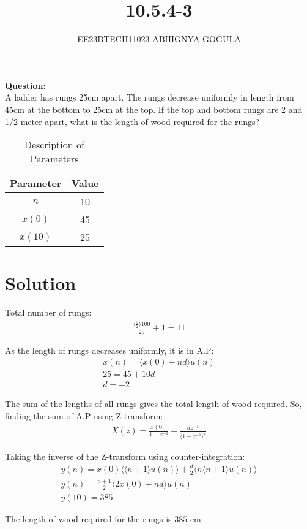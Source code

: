 \documentclass[journal,12pt,twocolumn]{IEEEtran}
\newcommand{\brak}[1]{\langle #1 \rangle}
\theoremstyle{remark}
\begin{document}

\vspace{3cm}
\title{\textbf{10.5.4-3}}
\author{EE23BTECH11023-ABHIGNYA GOGULA}
\maketitle
\newpage
\bigskip
\renewcommand{\thefigure}{\theenumi}
\renewcommand{\thetable}{\theenumi}
\textbf{Question:}
\\
 A ladder has rungs 25cm apart. The rungs decrease uniformly in length from 45cm at the bottom to 25cm at the top. If the top and bottom rungs are 2 and 1/2 meter apart, what is the length of wood required for the rungs?

\begin{table}[h]
\centering
\begin{tabular}{|c|c|}
\hline
Parameter & Value \\
\hline
$n$ & 10 \\
\hline
$x(0)$ & 45 \\
\hline
$x(10)$ & 25 \\
\hline
\end{tabular}
\caption{Description of Parameters}
\label{tab:parameter-values}
\end{table}

\section*{Solution}
Total number of rungs:
\begin{align}
\frac{\brak{\frac{5}{2}}100}{25}+1 = 11
\end{align}

As the length of rungs decreases uniformly, it is in A.P:
\begin{align}
x(n) = \brak{x(0) + nd}u(n) \\
25 = 45 + 10d \\
d = -2
\end{align}

The sum of the lengths of all rungs gives the total length of wood required. So, finding the sum of A.P using Z-transform:
\begin{align}
X(z) = \frac{x(0)}{1-z^{-1}} + \frac{dz^{-1}}{\brak{1-z^{-1}}^{2}}
\end{align}

Taking the inverse of the Z-transform using counter-integration:
\begin{align}
y(n) = x(0)\brak{\brak{n+1}u(n)}+\frac{d}{2}\brak{n\brak{n+1}u(n)} \\
y(n) = \frac{n+1}{2}\brak{2x(0)+nd}u(n) \\
y(10) = 385
\end{align}

The length of wood required for the rungs is $385$ cm.
\end{document}
